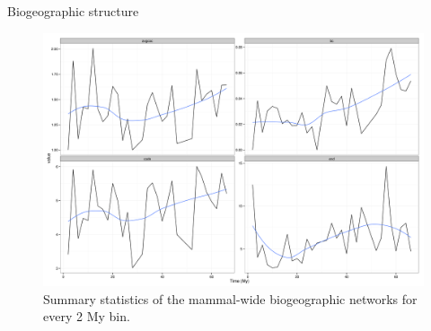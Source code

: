 \documentclass[final]{beamer}\usepackage[]{graphicx}\usepackage[]{color}
\newlength{\onecolwid}
\newlength{\twocolwid}
\begin{document}
\begin{frame}[t]
\begin{columns}[t]
\begin{column}{\twocolwid}
\begin{columns}[t,totalwidth = \twocolwid]
        \begin{column}{\onecolwid}
          \begin{block}{Biogeographic structure}
            \begin{figure}[ht]
              \begin{center}
                \includegraphics[height = 0.2\textheight]{figure/gen_bin}
              \end{center}
              \caption{Summary statistics of the mammal-wide biogeographic networks for every 2 My bin.}
              \label{fig:net_gen}
            \end{figure}
          \end{block}
        \end{column}
      \end{columns}


\end{column}
\end{columns}
\end{frame}
\end{document}
